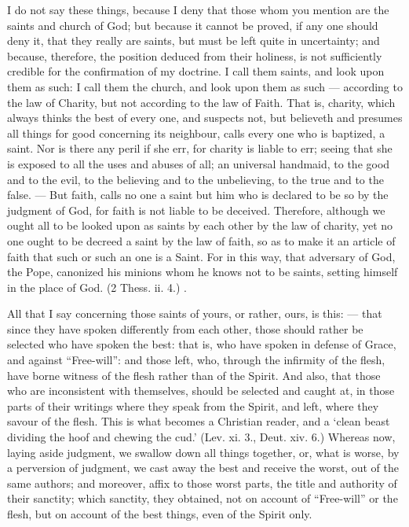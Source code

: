 I do not say these things, because I deny that those whom you mention are the saints and church of God; but because it cannot be proved, if any one should deny it, that they really are saints, but must be left quite in uncertainty; and because, therefore, the position deduced from their holiness, is not sufficiently credible for the confirmation of my doctrine. I call them saints, and look upon them as such: I call them the church, and look upon them as such — according to the law of Charity, but not according to the law of Faith. That is, charity, which always thinks the best of every one, and suspects not, but believeth and presumes all things for good concerning its neighbour, calls every one who is baptized, a saint. Nor is there any peril if she err, for charity is liable to err; seeing that she is exposed to all the uses and abuses of all; an universal handmaid, to the good and to the evil, to the believing and to the unbelieving, to the true and to the false. — But faith, calls no one a saint but him who is declared to be so by the judgment of God, for faith is not liable to be deceived. Therefore, although we ought all to be looked upon as saints by each other by the law of charity, yet no one ought to be decreed a saint by the law of faith, so as to make it an article of faith that such or such an one is a Saint. For in this way, that adversary of God, the Pope, canonized his minions whom he knows not to be saints, setting himself in the place of God. (2 Thess. ii. 4.) .

All that I say concerning those saints of yours, or rather, ours, is this: — that since they have spoken differently from each other, those should rather be selected who have spoken the best: that is, who have spoken in defense of Grace, and against “Free-will”: and those left, who, through the infirmity of the flesh, have borne witness of the flesh rather than of the Spirit. And also, that those who are inconsistent with themselves, should be selected and caught at, in those parts of their writings where they speak from the Spirit, and left, where they savour of the flesh. This is what becomes a Christian reader, and a ‘clean beast dividing the hoof and chewing the cud.’ (Lev. xi. 3., Deut. xiv. 6.) Whereas now, laying aside judgment, we swallow down all things together, or, what is worse, by a perversion of judgment, we cast away the best and receive the worst, out of the same authors; and moreover, affix to those worst parts, the title and authority of their sanctity; which sanctity, they obtained, not on account of “Free-will” or the flesh, but on account of the best things, even of the Spirit only.

